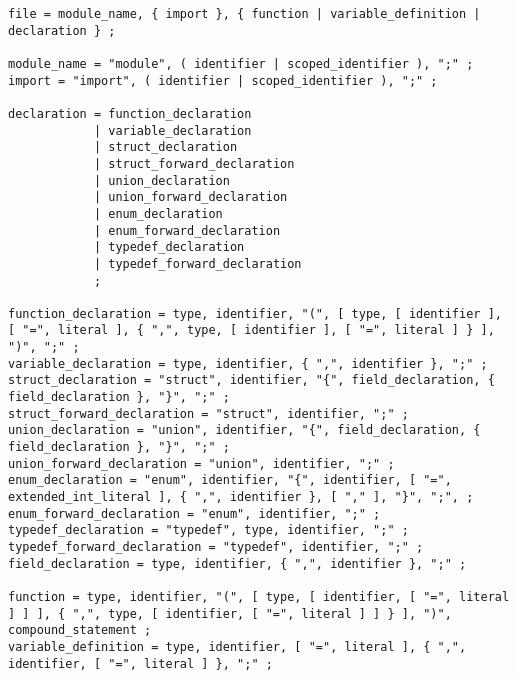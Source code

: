 \documentclass[letterpaper,12pt]{book}
\begin{document}
\begin{lstlisting}[breaklines=true]
file = module_name, { import }, { function | variable_definition | declaration } ;

module_name = "module", ( identifier | scoped_identifier ), ";" ;
import = "import", ( identifier | scoped_identifier ), ";" ;

declaration = function_declaration
            | variable_declaration
            | struct_declaration
            | struct_forward_declaration
            | union_declaration
            | union_forward_declaration
            | enum_declaration
            | enum_forward_declaration
            | typedef_declaration
            | typedef_forward_declaration
            ;

function_declaration = type, identifier, "(", [ type, [ identifier ], [ "=", literal ], { ",", type, [ identifier ], [ "=", literal ] } ], ")", ";" ;
variable_declaration = type, identifier, { ",", identifier }, ";" ;
struct_declaration = "struct", identifier, "{", field_declaration, { field_declaration }, "}", ";" ;
struct_forward_declaration = "struct", identifier, ";" ;
union_declaration = "union", identifier, "{", field_declaration, { field_declaration }, "}", ";" ;
union_forward_declaration = "union", identifier, ";" ;
enum_declaration = "enum", identifier, "{", identifier, [ "=", extended_int_literal ], { ",", identifier }, [ "," ], "}", ";", ;
enum_forward_declaration = "enum", identifier, ";" ;
typedef_declaration = "typedef", type, identifier, ";" ;
typedef_forward_declaration = "typedef", identifier, ";" ;
field_declaration = type, identifier, { ",", identifier }, ";" ;

function = type, identifier, "(", [ type, [ identifier, [ "=", literal ] ] ], { ",", type, [ identifier, [ "=", literal ] ] } ], ")", compound_statement ;
variable_definition = type, identifier, [ "=", literal ], { ",", identifier, [ "=", literal ] }, ";" ;


\end{lstlisting}
\end{document}
